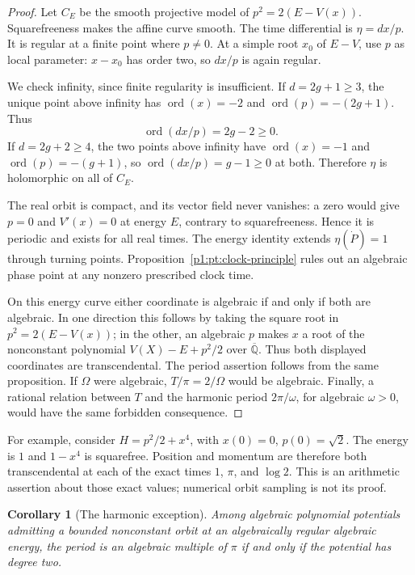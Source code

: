 \documentclass[11pt,a4paper]{article}
\newtheorem{corollary}[theorem]{Corollary}
\theoremstyle{definition}
\theoremstyle{remark}
\numberwithin{equation}{section}
\begin{document}
\begin{proof}
Let $C_E$ be the smooth projective model of
$p^2=2(E-V(x))$.  Squarefreeness makes the affine curve smooth.
The time differential is $\eta=dx/p$.  It is regular at a finite
point where $p\ne0$.  At a simple root $x_0$ of $E-V$, use $p$ as
local parameter: $x-x_0$ has order two, so $dx/p$ is again regular.

We check infinity, since finite regularity is insufficient.
If $d=2g+1\ge3$, the unique point above infinity has
$\operatorname{ord}(x)=-2$ and $\operatorname{ord}(p)=-(2g+1)$.
Thus
\[
 \operatorname{ord}(dx/p)=2g-2\ge0.
\]
If $d=2g+2\ge4$, the two points above infinity have
$\operatorname{ord}(x)=-1$ and $\operatorname{ord}(p)=-(g+1)$,
so $\operatorname{ord}(dx/p)=g-1\ge0$ at both.  Therefore $\eta$
is holomorphic on all of $C_E$.

The real orbit is compact, and its vector field never vanishes:
a zero would give $p=0$ and $V'(x)=0$ at energy $E$, contrary to
squarefreeness.  Hence it is periodic and exists for all real times.
The energy identity extends $\eta(\dot P)=1$ through turning points.
Proposition~\ref{p1:pt:clock-principle} rules out an algebraic phase
point at any nonzero prescribed clock time.

On this energy curve either coordinate is algebraic if and only if
both are algebraic.  In one direction this follows by taking the square
root in $p^2=2(E-V(x))$; in the other, an algebraic $p$ makes $x$ a
root of the nonconstant polynomial $V(X)-E+p^2/2$ over
$\overline{\mathbb Q}$.  Thus both displayed coordinates are
transcendental.  The period assertion follows from the same proposition.
If $\Omega$ were algebraic, $T/\pi=2/\Omega$ would be algebraic.
Finally, a rational relation between $T$ and the harmonic period
$2\pi/\omega$, for algebraic $\omega>0$, would have the same forbidden
consequence.
\end{proof}

For example, consider $H=p^2/2+x^4$, with $x(0)=0$, $p(0)=\sqrt2$.
The energy is $1$ and $1-x^4$ is squarefree.  Position and momentum
are therefore both transcendental at each of the exact times
$1$, $\pi$, and $\log2$.  This is an arithmetic assertion about those
exact values; numerical orbit sampling is not its proof.

\begin{corollary}[The harmonic exception]
\label{p1:pt:harmonic-exception}
Among algebraic polynomial potentials admitting a bounded nonconstant
orbit at an algebraically regular algebraic energy, the period is an
algebraic multiple of $\pi$ if and only if the potential has degree two.
\end{corollary}
\end{document}
